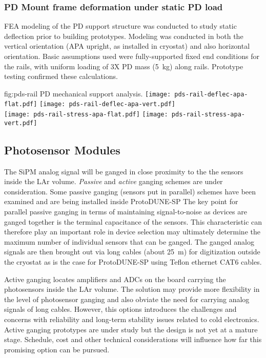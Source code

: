 \subsubsection{PD Mount frame deformation under static PD load}

FEA modeling of the PD support structure was conducted to study static deflection 
prior to building prototypes.  Modeling was conducted in both the vertical
 orientation (APA upright, as installed in cryostat) and also horizontal orientation.  
Basic assumptions used were fully-supported fixed end conditions for the rails, 
with uniform loading of 3X PD mass (\SI{5}{kg}) along rails.  
Prototype testing confirmed these calculations.

\begin{dunefigure}{fig:pds-rail}
{PD mechanical support analysis.}
	\texttt{[image: pds-rail-deflec-apa-flat.pdf]} 
	\texttt{[image: pds-rail-deflec-apa-vert.pdf]}\\
	\texttt{[image: pds-rail-stress-apa-flat.pdf]} 
	\texttt{[image: pds-rail-stress-apa-vert.pdf]}
\end{dunefigure}

\subsection{Photosensor Modules}
\label{sec:fdsp-pd-assy-psm}

The SiPM analog signal will be ganged in close proximity to the the sensors inside the
LAr volume. {\it Passive} and {\it active} ganging schemes are under consideration. Some passive
ganging (sensors put in parallel) schemes have been examined and are being installed inside
ProtoDUNE-SP 
The key point for parallel passive ganging in terms of  maintaining signal-to-noise as devices are ganged together is the terminal capacitance of the sensors. This characteristic can therefore play an important role in device selection may ultimately determine  the maximum number of individual sensors that can be ganged. The ganged analog signals are then brought out via long cables (about \SI{25}{m}) for digitization outside the cryostat as is the case for ProtoDUNE-SP using Teflon ethernet CAT6 cables.

Active ganging locates amplifiers and ADCs on the board carrying  the photosensors inside the LAr volume. The solution
 may provide more flexibility in the level of photosensor ganging and also obviate the need for carrying analog signals of long cables.
However, this options introduces the challenges and concerns with reliability and long-term
stability issues related to cold electronics.  Active ganging prototypes are under study 
but the design is not yet at a mature stage. Schedule, cost and other technical
considerations will influence how far this promising option can be pursued.

